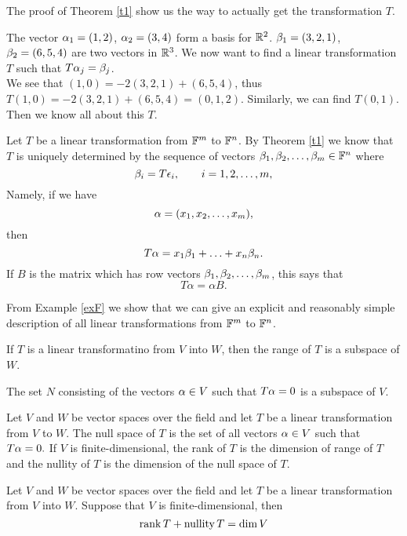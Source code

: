\documentclass{mynotes}
\begin{document}
\begin{remark}
The proof of Theorem \ref{t1} show us the way to actually get the transformation $T$. 
\end{remark}
\begin{problem}
The vector $\alpha_1 = (1,2)$, $\alpha_2 = (3, 4)$ form a basis for $\mathbb{R}^2$. $\beta_1 = (3,2,1)$, $\beta_2 = (6,5,4)$ are two vectors in $\mathbb{R}^3$. We now want to find a linear transformation $T$ such that $T\alpha_j=\beta_j$.\\
We see that $(1,0) = -2(3,2,1) +(6,5,4)$, thus $T(1,0) = -2(3,2,1)+(6,5,4) = (0,1,2)$. Similarly, we can find $T(0,1)$. Then we know all about this $T$.
\end{problem}
\begin{example}\label{exF}
Let $T$ be a linear transformation from $\mathbb{F}^m$ to $\mathbb{F}^n$. By Theorem \ref{t1} we know that $T$ is uniquely determined by the sequence of vectors $\beta_1,\beta_2,\ldots,\beta_m\in\mathbb{F}^n$ where $$\beta_i = T\epsilon_i, \qquad i = 1,2,\ldots, m,$$Namely, if we have $$\alpha = (x_1,x_2,\ldots,x_m),$$then $$T\alpha = x_1\beta_1+\ldots+x_n\beta_n.$$If $B$ is the \mbyn{} matrix which has row vectors $\beta_1,\beta_2,\ldots,\beta_m$, this says that $$T\alpha = \alpha B.$$
\end{example}
\begin{remark}
From Example \ref{exF} we show that we can give an explicit and reasonably simple description of all linear transformations from $\mathbb{F}^m$ to $\mathbb{F}^n$.
\end{remark}
\begin{remark}If $T$ is a linear transformatino from $V$ into $W$, then the range of $T$ is a subspace of $W$.
\end{remark}
\begin{remark}The set $N$ consisting of the vectors $\alpha\in V$ such that $T\alpha = 0$ is a subspace of $V$.
\end{remark}
\begin{definition}
Let $V$ and $W$ be vector spaces over the field \F{} and let $T$ be a linear transformation from $V$ to $W$. The null space of $T$ is the set of all vectors $\alpha\in V$ such that $T\alpha = 0.$
If $V$ is finite-dimensional, the rank of $T$ is the dimension of range of $T$ and the nullity of $T$ is the dimension of the null space of $T$.
\end{definition}
\begin{theorem}
Let $V$ and $W$ be vector spaces over the field \F{} and let $T$ be a linear transformation from $V$ into $W$. Suppose that $V$ is finite-dimensional, then $$\mathrm{rank}\,{T} + \mathrm{nullity}\,{T} = \dim V$$
\end{theorem}
\end{document}
